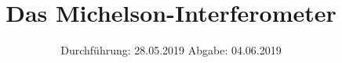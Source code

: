 

\subject{V401}
\title{Das Michelson-Interferometer}
\date{
  Durchführung: 28.05.2019
  \hspace{3em}
  Abgabe: 04.06.2019
}


\maketitle
\thispagestyle{empty}
\tableofcontents
\newpage

%


%

%

\nocite{*}
\printbibliography

